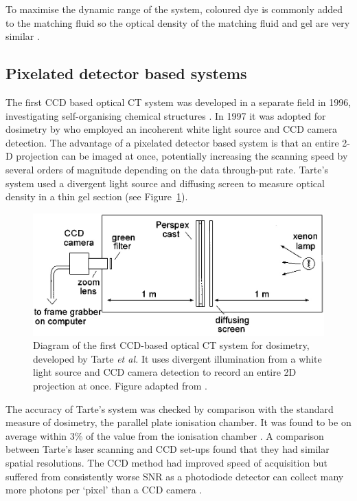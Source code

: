 	To maximise the dynamic range of the system, coloured dye is commonly added to the matching fluid so the optical density of the matching fluid and gel are very similar \cite{Krstajic:2006kna}. 
	
	
	
	
	\subsection*{Pixelated detector based systems}
	
	The first CCD based optical CT system was developed in a separate field in 1996, investigating self-organising chemical structures \cite{Winfree:1996}.
	In 1997 it was adopted for dosimetry by \cite{Tarte:2007} who employed an incoherent white light source and CCD camera detection. The advantage  of a pixelated detector based system  is that an entire 2-D projection can be imaged at once, potentially increasing the scanning speed by several  orders of magnitude depending on the data through-put rate. Tarte's system used a divergent light source and diffusing screen to measure optical density in a thin gel section (see Figure~\ref{fig:tarte_ccd_setup}). 
	
	\begin{figure}[H]
		\centering
		\includegraphics[scale=0.4]{intro_img/Tarte_1997_ccdsetup.jpg}
		\caption{Diagram of the first CCD-based  optical CT system for dosimetry, developed by Tarte \textit{et al.} It uses  divergent illumination from a white light source and CCD camera detection to record an entire 2D projection at once.   Figure adapted from \cite{Tarte:2007}. }
		\label{fig:tarte_ccd_setup}
	\end{figure}
	
	
	The accuracy of Tarte's system  was checked by comparison with the standard measure of dosimetry, the parallel plate ionisation chamber. It was found to be on average within 3\% of the value from the ionisation chamber \cite{Tarte:2007}. A comparison between Tarte's laser scanning and CCD set-ups found that they had similar spatial resolutions. The CCD method had improved speed of acquisition but suffered from consistently worse SNR as a photodiode detector can collect many more photons per `pixel' than a CCD camera \cite{Tarte:2007}.
	
